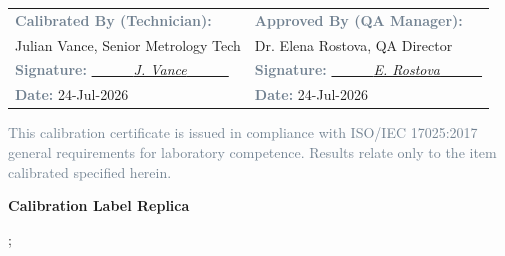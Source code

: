 \documentclass[10pt,a4paper]{scrartcl}
\newcommand{\fieldlabel}[1]{\textcolor{SlateGrey}{\small\bfseries #1}}
\newcommand{\fieldval}[1]{{\small #1}}
\begin{document}
\begin{tcolorbox}[sectionbox, title={\faUserCheck\ SECTION 7: QUALITY ASSURANCE AUTHORIZATION \& SIGN-OFF}]
\begin{minipage}[t]{0.62\textwidth}
  \small
  \begin{tabularx}{\textwidth}{@{}X X@{}}
    \fieldlabel{Calibrated By (Technician):} & \fieldlabel{Approved By (QA Manager):} \\[2pt]
    \fieldval{Julian Vance, Senior Metrology Tech} & \fieldval{Dr. Elena Rostova, QA Director} \\[12pt]
    \fieldlabel{Signature:} \underline{~~~~~~\textit{J. Vance}~~~~~~} & \fieldlabel{Signature:} \underline{~~~~~~\textit{E. Rostova}~~~~~~} \\[8pt]
    \fieldlabel{Date:} \fieldval{24-Jul-2026} & \fieldlabel{Date:} \fieldval{24-Jul-2026} \\
  \end{tabularx}
  
  \vspace{6pt}
  \scriptsize \textcolor{SlateGrey}{This calibration certificate is issued in compliance with ISO/IEC 17025:2017 general requirements for laboratory competence. Results relate only to the item calibrated specified herein.}
\end{minipage}%
\hfill
\begin{minipage}[t]{0.35\textwidth}
  \centering
  \textbf{\small Calibration Label Replica}\\[2pt]
  \begin{tikz}
    ;
  \end{tikz}
\end{minipage}
\end{tcolorbox}
\end{document}
